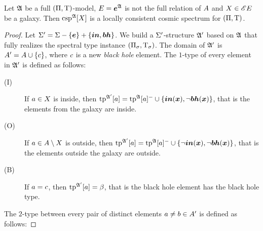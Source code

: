 \begin{remark}\label{rem:csp-is-locally-consistent}
Let $\mathfrak{A}$ be a full $(\Pi,\mathrm{T})$-model, $E = \bm{e}^{\mathfrak{A}}$ is not the
full relation of $A$ and $X \in {\mathscr{E}E}$ be a galaxy. Then
$\operatorname{csp}^{\mathfrak{A}}[X]$ is a locally consistent cosmic spectrum for $(\Pi,\mathrm{T})$.
\end{remark}
\begin{proof}
Let $\mathrm{\Sigma'} = \mathrm{\Sigma} - \left\{\bm{e}\right\} + \left\{\bm{in},\bm{bh}\right\}$. We build a $\mathrm{\Sigma'}$-structure
$\mathfrak{A'}$ based on $\mathfrak{A}$ that fully realizes the spectral type instance
$(\Pi_\sigma, \mathrm{T}_\sigma)$. The domain of $\mathfrak{A'}$ is $A' = A \cup
\left\{c\right\}$, where $c$ is a new \emph{black hole} element. The $1$-type of
every element in $\mathfrak{A'}$ is defined as follows:
\begin{description}
  \item[(I)] If $a \in X$ is inside, then $\operatorname{tp}^{\mathfrak{A'}}[a] =
  \operatorname{tp}^{\mathfrak{A}}[a]^{-} \cup \left\{\bm{in}(\bm{x}),\lnot\bm{bh}(\bm{x})\right\}$,
  that is the elements from the galaxy are inside.
  \item[(O)] If $a \in A\setminus X$ is outside, then $\operatorname{tp}^{\mathfrak{A'}}[a] =
  \operatorname{tp}^{\mathfrak{A}}[a]^{-} \cup \left\{\lnot\bm{in}(\bm{x}),\lnot\bm{bh}(\bm{x})\right\}$, that is the
  elements outside the galaxy are outside.
  \item[(B)] If $a = c$, then $\operatorname{tp}^{\mathfrak{A'}}[a] = \beta$, that is the black
  hole element has the black hole type.
\end{description}
The $2$-type between every pair of distinct elements $a \neq b \in A'$
is defined as follows:
\end{proof}
